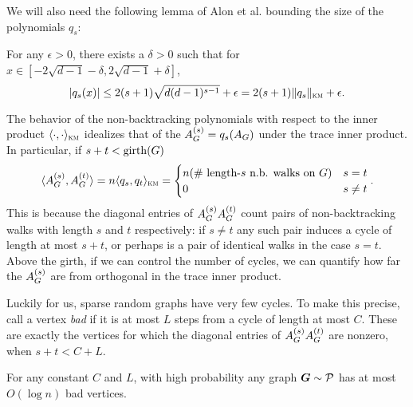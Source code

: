 
We will also need the following lemma of Alon et al. \cite[Lemma 2.3]{alon2007non} bounding the size of the polynomials $q_s$:
\begin{lemma}   \label{lem:NBW-poly-bound}
    For any $\epsilon>0$, there exists a $\delta>0$ such that for $x\in[-2\sqrt{d-1}-\delta,2\sqrt{d-1}+\delta]$,
    $$
        |q_s(x)| \le 2(s+1)\sqrt{d(d-1)^{s-1}} + \epsilon = 2(s+1)\|q_s\|_{\textsc{km}} + \epsilon.
    $$
\end{lemma}

The behavior of the non-backtracking polynomials with respect to the inner product $\langle \cdot,\cdot \rangle_{\textsc{km}}$ idealizes that of the $A^{(s)}_{G} = q_s(A_{G})$ under the trace inner product. In particular, if $s + t < \operatorname{girth}(G)$
$$
    \langle A^{(s)}_{G},A^{(t)}_{G} \rangle = n\langle q_s,q_t \rangle_{\textsc{km}} = \begin{cases} n (\text{\# length-$s$ n.b. walks on $G$}) & s=t \\ 0 & s \neq t \end{cases}.
$$
This is because the diagonal entries of $A^{(s)}_{G}A^{(t)}_{G}$ count pairs of non-backtracking walks with length $s$ and $t$ respectively: if $s\neq t$ any such pair induces a cycle of length at most $s+t$, or perhaps is a pair of identical walks in the case $s=t$. Above the girth, if we can control the number of cycles, we can quantify how far the $A^{(s)}_{G}$ are from orthogonal in the trace inner product.

Luckily for us, sparse random graphs have very few cycles. To make this precise, call a vertex \emph{bad} if it is at most $L$ steps from a cycle of length at most $C$. These are exactly the vertices for which the diagonal entries of $A^{(s)}_{G}A^{(t)}_{G}$ are nonzero, when $s+t < C+L$.

\begin{lemma}
    For any constant $C$ and $L$, with high probability any graph $\boldsymbol{G} \sim \mathcal{P}$ has at most $O(\log n)$ bad vertices.
\end{lemma}

